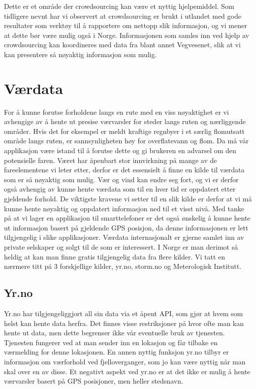 \documentclass[a4paper,norsk,oneside]{book}
\begin{document}
Dette er et område der crowdsourcing kan være et nyttig hjelpemiddel. Som tidligere nevnt har vi observert at crowdsourcing er brukt i utlandet med gode resultater som verktøy til å rapportere om nettopp slik informasjon, og vi mener at dette bør være mulig også i Norge. Informasjonen som samles inn ved hjelp av crowdsourcing kan koordineres med data fra blant annet Vegvesenet, slik at vi kan presentere så nøyaktig informasjon som mulig. 

\section{Værdata}
For å kunne forutse forholdene langs en rute med en viss nøyaktighet er vi avhengige av å hente ut presise værvarsler for steder langs ruten og nærliggende områder. Hvis det for eksempel er meldt kraftige regnbyer i et særlig flomutsatt område langs ruten, er sannsynligheten høy for overflatevann og flom. Da må vår applikasjon være istand til å forutse dette og gi brukeren en advarsel om den potensielle faren. Været har åpenbart stor innvirkning på mange av de fareelementene vi leter etter, derfor er det essensielt å finne en kilde til værdata som er så nøyaktig som mulig. Vær og vind kan endre seg fort, og vi er derfor også avhengig av kunne hente værdata som til en hver tid er oppdatert etter gjeldende forhold. De viktigste kravene vi setter til en slik kilde er derfor at vi må kunne hente nøyaktig og oppdatert informasjon ned til et visst nivå. Med tanke på at vi lager en applikasjon til smarttelefoner er det også ønskelig å kunne hente ut informasjon basert på gjeldende GPS posisjon, da denne informasjonen er lett tilgjengelig i slike applikasjoner. Værdata internasjonalt er gjerne samlet inn av private selskaper og solgt til de som er interessert. I Norge er man derimot så heldig at kan man finne gratis tilgjengelig data fra flere kilder. Vi tatt en nærmere titt på 3 forskjellige kilder, yr.no, storm.no og Meterologisk Institutt.

\subsection{Yr.no}
Yr.no har tilgjengeliggjort all sin data via et åpent API, som gjør at hvem som helst kan hente data herfra. Det finnes visse restriksjoner på hvor ofte man kan hente ut data, men dette begrenser ikke vår eventuelle bruk av tjenesten. Tjenesten fungerer ved at man sender inn en lokasjon og får tilbake en værmelding for denne lokasjonen. En annen nyttig funksjon yr.no tilbyr er informasjon om værforhold ved fjelloverganger, som jo kan være nyttig når man skal over en av disse. Et negativt aspekt ved yr.no er at det ikke er mulig å hente værvarsler basert på GPS posisjoner, men heller stedsnavn.
\end{document}
